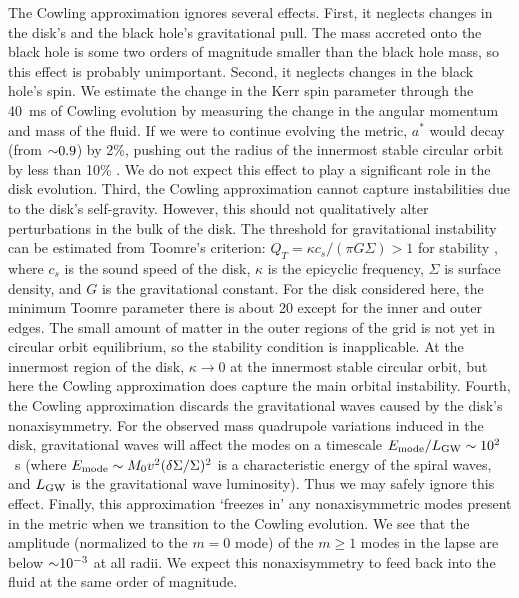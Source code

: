 The Cowling approximation ignores several effects.
First, it neglects changes in the disk's and the black hole's gravitational pull.
The mass accreted onto the black hole is some two orders of magnitude smaller than
the black hole mass, so this effect is probably unimportant.
Second, it neglects changes in the black hole's spin. We estimate the
change in the Kerr spin parameter through the 40~ms of Cowling evolution by
measuring the change in the angular momentum and mass of the fluid.
If we were to continue evolving the metric, $a^*$ would decay
(from $\mathord{\sim}0.9$) by 2\%, pushing out the radius of the innermost stable
circular orbit by less than 10\% \citep{bard1972-rotating_bh}.
We do not expect this effect to play a significant role in the disk evolution.
Third, the Cowling approximation cannot capture instabilities
due to the disk's self-gravity. However, this should not qualitatively
alter perturbations in the bulk of the disk.
The threshold for gravitational instability can be estimated from Toomre's
criterion:  $Q_T=\kappa c_s/(\pi G\Sigma) >1$ for stability
\citep{safr1960-grav_instability,toom1964-grav_stability}, where $c_s$ is the sound
speed of the disk, $\kappa$ is the epicyclic frequency, 
$\Sigma$ is surface density, and $G$ is the gravitational constant.  For
the disk considered here, the minimum Toomre parameter there is about 20
except for the inner and outer edges.  The small amount of matter in
the outer regions of the grid is not yet in circular orbit equilibrium,
so the stability condition is inapplicable.  At the innermost region
of the disk, $\kappa\rightarrow 0$ at the innermost stable circular
orbit, but here the Cowling approximation does capture
the main orbital instability.
Fourth, the Cowling approximation discards the gravitational
waves caused by the disk's nonaxisymmetry.  For the observed mass
quadrupole variations induced in the disk, gravitational waves will
affect the modes on a timescale $E_{\rm mode}/L_{\rm GW}\sim 10^2$~s
(where $E_{\rm mode}\sim M_0 v^2(\delta\Sigma/\Sigma)^2$ is a
characteristic energy of the spiral waves, and
$L_{\rm GW}$ is the gravitational wave luminosity).
Thus we may safely ignore this effect.
Finally, this approximation `freezes in' any nonaxisymmetric modes present
in the metric when we transition to the Cowling evolution.
We see that the amplitude (normalized to the $m=0$ mode) of the $m\geq1$ modes
in the lapse are below $\mathord{\sim}10^{-3}$ at all radii. We expect this
nonaxisymmetry to feed back into the fluid at the same order of magnitude.

